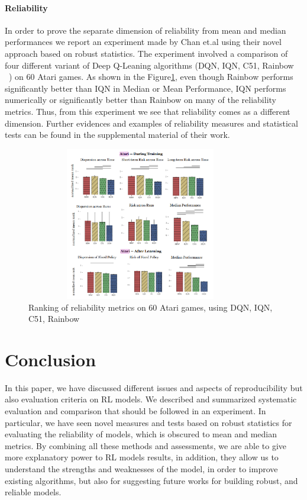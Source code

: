 \documentclass{article}
\begin{document}
\paragraph{Reliability}
In order to prove the separate dimension of reliability from mean and median performances we report an experiment made by Chan et.al using their novel approach based on robust statistics. The experiment involved a comparison of four different variant of Deep Q-Leaning algorithms (DQN, IQN, C51, Rainbow ~\cite{DQN, IQN, C51,Rainbow}) on 60 Atari games. As shown in the Figure\ref{fig:realibility}, even though Rainbow performs significantly better than IQN in Median or Mean Performance, IQN performs numerically or significantly better than Rainbow on many of the reliability metrics. Thus, from this experiment we see that reliability comes as a different dimension. Further evidences and examples of reliability measures and statistical tests can be found in the supplemental material of their work.
\begin{figure}[!t]
	\centering
	\includegraphics[width=10cm, height=6.7cm]{./images/atari_ranking.png}
	\caption{Ranking of reliability metrics on 60 Atari games, using DQN, IQN, C51, Rainbow~\cite{GoogleMeasure}}
	\label{fig:realibility}
	\footnotesize{}
\end{figure}
\section{Conclusion}
In this paper, we have discussed different issues and aspects of reproducibility but also evaluation criteria on RL models. We described and summarized systematic evaluation and comparison that should be followed in an experiment. In particular, we have seen novel measures and tests based on robust statistics for evaluating the reliability of models, which is obscured to mean and median metrics. By combining all these methods and assessments, we are able to give more explanatory power to RL models results, in addition, they allow us to understand the strengths and weaknesses of the model, in order to improve existing algorithms, but also for suggesting future works for building robust, and reliable models.

{\small
	
	
}

\appendix
\end{document}
